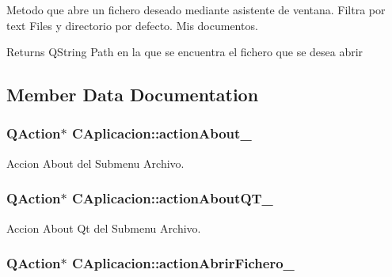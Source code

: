 Metodo que abre un fichero deseado mediante asistente de ventana. Filtra por text Files y directorio por defecto. Mis documentos. 

\begin{DoxyReturn}{Returns}
Q\+String Path en la que se encuentra el fichero que se desea abrir 
\end{DoxyReturn}


\subsection{Member Data Documentation}
\subsubsection[{\texorpdfstring{action\+About\+\_\+}{actionAbout_}}]{\setlength{\rightskip}{0pt plus 5cm}Q\+Action$\ast$ C\+Aplicacion\+::action\+About\+\_\+\hspace{0.3cm}{\ttfamily [private]}}\hypertarget{classCAplicacion_ac42dda1caacc0506c7015c79fde8416f}{}\label{classCAplicacion_ac42dda1caacc0506c7015c79fde8416f}


Accion About del Submenu Archivo. 

\subsubsection[{\texorpdfstring{action\+About\+Q\+T\+\_\+}{actionAboutQT_}}]{\setlength{\rightskip}{0pt plus 5cm}Q\+Action$\ast$ C\+Aplicacion\+::action\+About\+Q\+T\+\_\+\hspace{0.3cm}{\ttfamily [private]}}\hypertarget{classCAplicacion_af0ed23ead2d1c3aea79b724c3cb70249}{}\label{classCAplicacion_af0ed23ead2d1c3aea79b724c3cb70249}


Accion About Qt del Submenu Archivo. 

\subsubsection[{\texorpdfstring{action\+Abrir\+Fichero\+\_\+}{actionAbrirFichero_}}]{\setlength{\rightskip}{0pt plus 5cm}Q\+Action$\ast$ C\+Aplicacion\+::action\+Abrir\+Fichero\+\_\+\hspace{0.3cm}{\ttfamily [private]}}\hypertarget{classCAplicacion_a4fa499b5119ad7bcc86f53ace963cbbd}{}\label{classCAplicacion_a4fa499b5119ad7bcc86f53ace963cbbd}


